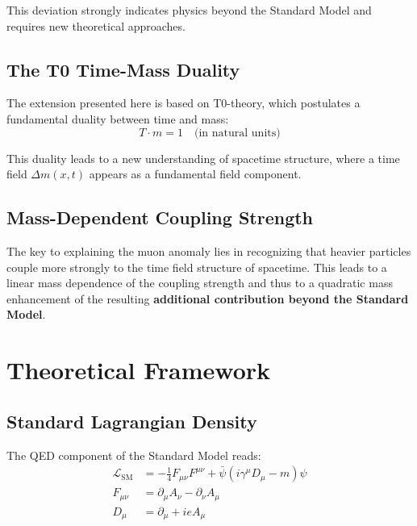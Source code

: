 \documentclass[12pt,a4paper]{article}
\theoremstyle{definition}
\begin{document}
	This deviation strongly indicates physics beyond the Standard Model and requires new theoretical approaches.
	
	\subsection{The T0 Time-Mass Duality}
	
	The extension presented here is based on T0-theory\cite{pascher_t0_theory_2025}, which postulates a fundamental duality between time and mass:
	\begin{equation}
		T \cdot m = 1 \quad \text{(in natural units)}
	\end{equation}
	
	This duality leads to a new understanding of spacetime structure, where a time field $\Delta m(x,t)$ appears as a fundamental field component\cite{pascher_lagrangian_extended_2025}.
	
	\subsection{Mass-Dependent Coupling Strength}
	
	The key to explaining the muon anomaly lies in recognizing that heavier particles couple more strongly to the time field structure of spacetime. This leads to a linear mass dependence of the coupling strength and thus to a quadratic mass enhancement of the resulting \textbf{additional contribution beyond the Standard Model}.
	
	\section{Theoretical Framework}
	
	\subsection{Standard Lagrangian Density}
	
	The QED component of the Standard Model reads:
	\begin{align}
		\mathcal{L}_{\text{SM}} &= -\tfrac{1}{4} F_{\mu\nu}F^{\mu\nu} + \bar{\psi}(i\gamma^\mu D_\mu - m)\psi \label{eq:sm_lagrangian}\\
		F_{\mu\nu} &= \partial_\mu A_\nu - \partial_\nu A_\mu \label{eq:field_tensor}\\
		D_\mu &= \partial_\mu + ieA_\mu \label{eq:covariant_derivative}
	\end{align}
	
\end{document}
